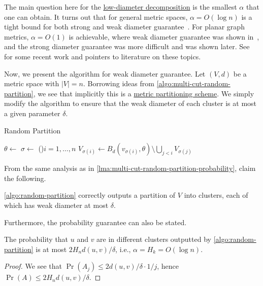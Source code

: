 The main question here for the \hyperref[def:low-diameter-decomposition]{low-diameter decomposition} is the smallest \(\alpha \) that one can obtain. It turns out that for general metric spaces, \(\alpha = O(\log n)\) is a tight bound for both strong and weak diameter guarantee~\cite{bartal1996probabilistic}. For planar graph metrics, \(\alpha = O(1)\) is achievable, where weak diameter guarantee was shown in~\cite{klein1993excluded}, and the strong diameter guarantee was more difficult and was shown later. See~\cite{filtser2024sparse} for some recent work and pointers to literature on these topics.

Now, we present the algorithm for weak diameter guarantee. Let \((V, d)\) be a metric space with \(\lvert V \rvert = n\). Borrowing ideas from \autoref{algo:multi-cut-random-partition}, we see that implicitly this is a \hyperref[def:low-diameter-decomposition-scheme]{metric partitioning scheme}. We simply modify the algorithm to ensure that the weak diameter of each cluster is at most a given parameter \(\delta \).

\begin{algorithm}[H]\label{algo:random-partition}
  \DontPrintSemicolon{}
  \caption{Random Partition~\cite{calinescu2005approximation}}

  \BlankLine

  \(\theta \gets\)\uniform{\([0, \delta / 2)\)}\;
  \(\sigma \gets\)
  \For(){\(i = 1, \dots , n\)}{
    \(V_{\sigma (i)} \gets B_d(v_{\sigma (i)}, \theta ) \setminus \bigcup_{j < i} V_{\sigma (j)}\)\;
  }
  \;
\end{algorithm}

From the same analysis as in \autoref{lma:multi-cut-random-partition-probability}, claim the following.

\begin{claim}
  \autoref{algo:random-partition} correctly outputs a partition of \(V\) into clusters, each of which has weak diameter at most \(\delta \).
\end{claim}

Furthermore, the probability guarantee can also be stated.

\begin{theorem}\label{thm:random-partition}
  The probability that \(u\) and \(v\) are in different clusters outputted by \autoref{algo:random-partition} is at most  \(2 H_n d(u, v) / \delta \), i.e., \(\alpha = H_k = O(\log n)\).
\end{theorem}
\begin{proof}
  We see that \(\Pr(A_j) \leq 2d(u, v) / \delta \cdot 1 / j\), hence \(\Pr(A) \leq 2 H_n d(u, v) / \delta \).
\end{proof}

